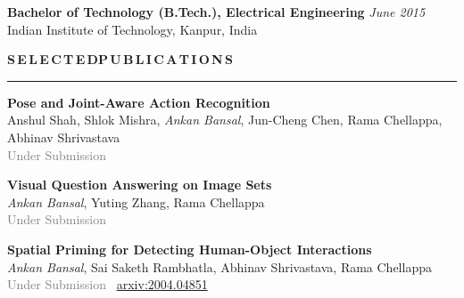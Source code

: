 \documentclass[11pt, a4paper]{article}
\begin{document}
\vspace{3pt}

\textbf{Bachelor of Technology (B.Tech.), Electrical Engineering} \hfill  \textit{June 2015} \\
Indian Institute of Technology, Kanpur, India


\vspace{10pt}

%

\textbf{S\,E\,L\,E\,C\,T\,E\,D{\hspace{0.6em}}P\,U\,B\,L\,I\,C\,A\,T\,I\,O\,N\,S}
\vspace{5pt}
\hrule
\vspace{7pt}

\textbf{Pose and Joint-Aware Action Recognition}\\
Anshul Shah, Shlok Mishra, \textit{Ankan Bansal}, Jun-Cheng Chen, Rama Chellappa, Abhinav
Shrivastava\\ 
\textcolor{gray}{Under Submission}

\vspace{4pt}


\textbf{Visual Question Answering on Image Sets}\\
\textit{Ankan Bansal}, Yuting Zhang, Rama Chellappa\\
\textcolor{gray}{Under Submission}

\vspace{4pt}

\textbf{Spatial Priming for Detecting Human-Object Interactions}\\
\textit{Ankan Bansal}, Sai Saketh Rambhatla, Abhinav Shrivastava, Rama Chellappa\\
\textcolor{gray}{Under Submission} ~\href{https://arxiv.org/abs/2004.04851}{arxiv:2004.04851}
\end{document}
